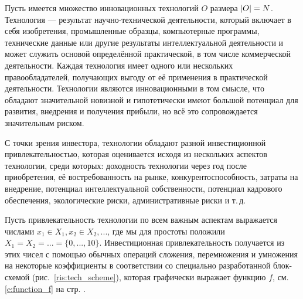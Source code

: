 
Пусть имеется множество инновационных технологий $O$ размера $\left| O \right| = N$.  Технология --- результат научно-технической деятельности, который включает в себя изобретения, промышленные образцы, компьютерные программы, технические данные или другие результаты интеллектуальной деятельности и может служить основой определённой практической, в том числе коммерческой деятельности. Каждая технология имеет одного или нескольких правообладателей, получающих выгоду от её применения в практической деятельности. Технологии являются инновационными в том смысле, что обладают значительной новизной и гипотетически имеют большой потенциал для развития, внедрения и получения прибыли, но всё это сопровождается значительным риском. 


С точки зрения инвестора, технологии обладают разной инвестиционной привлекательностью, которая оценивается исходя из нескольких аспектов технологии, среди которых: доходность технологии через год после приобретения, её востребованность на рынке, конкурентоспособность, затраты на внедрение, потенциал интеллектуальной собственности, потенциал кадрового обеспечения, экологические риски, административные риски и т.\,д. 

Пусть привлекательность технологии по всем важным аспектам выражается числами $x_1 \in X_1, x_2 \in X_2, ...$, где мы для простоты положили $X_1 = X_2 = ... = \{0, ..., 10\}$. Инвестиционная привлекательность получается из этих чисел с помощью обычных операций сложения, перемножения и умножения на некоторые коэффициенты в соответствии со специально разработанной блок-схемой (рис.~\ref{ris:tech_scheme}), которая графически выражает функцию $f$, см. \eqref{e:function_f} на стр. \pageref{e:function_f}. 

